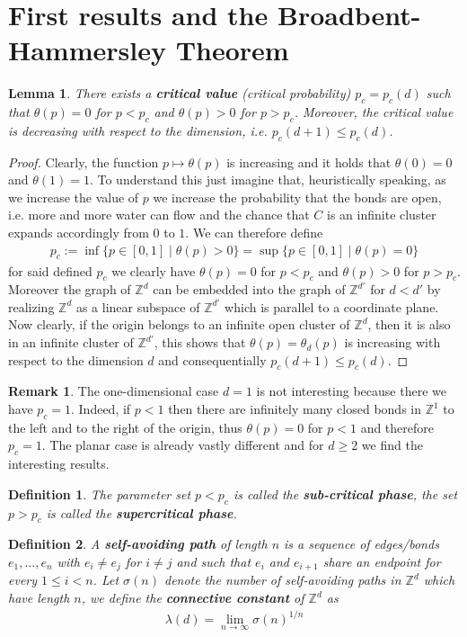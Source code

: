 \documentclass[12pt,a4paper]{article}
\newtheorem{lem}{Lemma}[section]
\newtheorem{defn}{Definition}[section]
\theoremstyle{definition}
\newtheorem{rem}{Remark}[section]
\begin{document}
\section{First results and the Broadbent-Hammersley Theorem}
\begin{lem} There exists a \textbf{critical value} (critical probability) $p_c=p_c(d)$ such that $\theta(p)=0$ for $p<p_c$ and $\theta(p)>0$ for $p > p_c$. Moreover, the critical value is decreasing with respect to the dimension, i.e. $p_c(d+1) \leq p_c(d)$. 
\end{lem}
\begin{proof}
Clearly, the function $p \mapsto \theta(p)$ is increasing and it holds that $\theta(0)=0$ and $\theta(1)=1$. To understand this just imagine that, heuristically speaking, as we increase the value of $p$ we increase the probability that the bonds are open, i.e. more and more water can flow and the chance that $C$ is an infinite cluster expands accordingly from $0$ to $1$. We can therefore define
\begin{align*}
p_c:= \inf \{ p \in [0,1] \mid \theta(p) > 0 \} = \sup \{ p \in [0,1] \mid \theta(p)=0 \}
\end{align*}
for said defined $p_c$ we clearly have $\theta(p)=0$ for $p<p_c$ and $\theta(p)>0$ for $p>p_c$. Moreover the graph of $\mathbb{Z}^d$ can be embedded into the graph of $\mathbb{Z}^{d'}$ for $d<d'$ by realizing $\mathbb{Z}^d$ as a linear subspace of $\mathbb{Z}^{d'}$ which is parallel to a coordinate plane. Now clearly, if the origin belongs to an infinite open cluster of $\mathbb{Z}^d$, then it is also in an infinite cluster of $\mathbb{Z}^{d'}$, this shows that $\theta(p)=\theta_d(p)$ is increasing with respect to the dimension $d$ and consequentially $p_c(d+1)\leq p_c(d) $.
\end{proof}
\begin{rem} The one-dimensional case $d=1$ is not interesting because there we have $p_c=1$. Indeed, if $p<1$ then there are infinitely many closed bonds in $\mathbb{Z}^1$ to the left and to the right of the origin, thus $\theta(p)=0$ for $p<1$ and therefore $p_c=1$. The planar case is already vastly different and for $d \geq 2$ we find the interesting results. 
\end{rem}
\begin{defn} The parameter set $p < p_c$ is called the \textbf{sub-critical phase}, the set $p>p_c$ is called the \textbf{supercritical phase}. 
\end{defn}
\begin{defn} A \textbf{self-avoiding path} of length $n$ is a sequence of edges/bonds $e_1, \dots , e_n$ with $e_i \neq e_j$ for $i \neq j$ and such that $e_i$ and $e_{i+1}$ share an endpoint for every $1 \leq i <n$. Let $\sigma(n)$ denote the number of self-avoiding paths in $\mathbb{Z}^d$ which have length $n$, we define the \textbf{connective constant} of $\mathbb{Z}^d$ as
\begin{align*}
\lambda (d) = \lim_{n \to \infty} \sigma(n)^{1/n}
\end{align*}
\end{defn}
\end{document}

